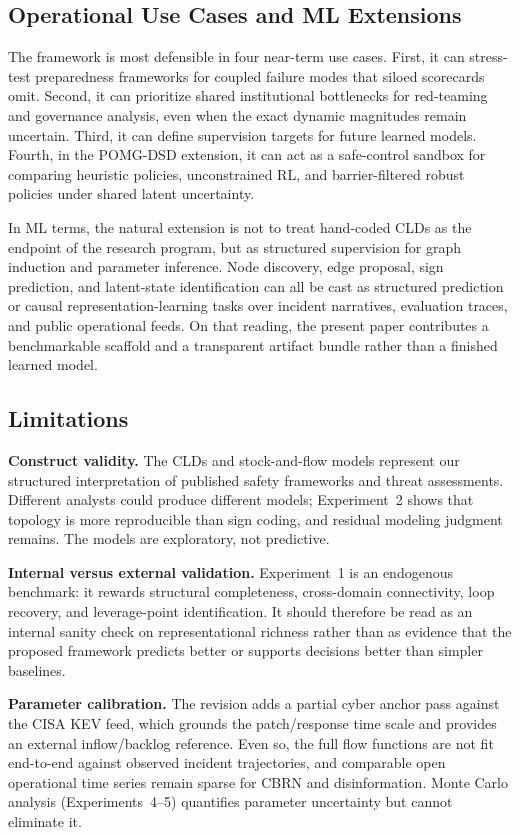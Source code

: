 \documentclass[11pt]{article}
\begin{document}
\subsection{Operational Use Cases and ML Extensions}

The framework is most defensible in four near-term use cases. First, it can stress-test preparedness frameworks for coupled failure modes that siloed scorecards omit. Second, it can prioritize shared institutional bottlenecks for red-teaming and governance analysis, even when the exact dynamic magnitudes remain uncertain. Third, it can define supervision targets for future learned models. Fourth, in the POMG-DSD extension, it can act as a safe-control sandbox for comparing heuristic policies, unconstrained RL, and barrier-filtered robust policies under shared latent uncertainty.

In ML terms, the natural extension is not to treat hand-coded CLDs as the endpoint of the research program, but as structured supervision for graph induction and parameter inference. Node discovery, edge proposal, sign prediction, and latent-state identification can all be cast as structured prediction or causal representation-learning tasks over incident narratives, evaluation traces, and public operational feeds. On that reading, the present paper contributes a benchmarkable scaffold and a transparent artifact bundle rather than a finished learned model.

\subsection{Limitations}

\textbf{Construct validity.} The CLDs and stock-and-flow models represent our structured interpretation of published safety frameworks and threat assessments. Different analysts could produce different models; Experiment~2 shows that topology is more reproducible than sign coding, and residual modeling judgment remains. The models are exploratory, not predictive.

\textbf{Internal versus external validation.} Experiment~1 is an endogenous benchmark: it rewards structural completeness, cross-domain connectivity, loop recovery, and leverage-point identification. It should therefore be read as an internal sanity check on representational richness rather than as evidence that the proposed framework predicts better or supports decisions better than simpler baselines.

\textbf{Parameter calibration.} The revision adds a partial cyber anchor pass against the CISA KEV feed, which grounds the patch/response time scale and provides an external inflow/backlog reference. Even so, the full flow functions are not fit end-to-end against observed incident trajectories, and comparable open operational time series remain sparse for CBRN and disinformation. Monte Carlo analysis (Experiments~4--5) quantifies parameter uncertainty but cannot eliminate it.
\end{document}
